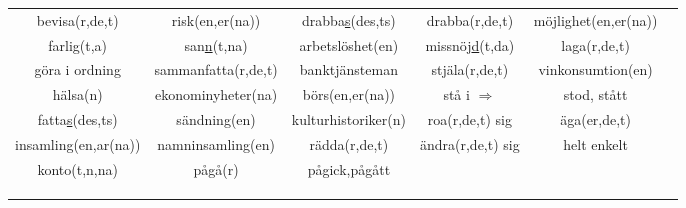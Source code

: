 \begin{center}
\begin{adjustwidth}{-2.6cm}{}
\begin{tabular}{|c c c c c c|}
            bevisa(r,de,t) & risk(en,er(na)) & drabba\underline{s}(des,ts) & drabba(r,de,t) & möjlighet(en,er(na)) &  \\
            farlig(t,a) & san\underline{n}(t,na) & arbetslöshet(en) & missnöj\underline{d}(t,da) & laga(r,de,t) &  \\
            göra i ordning & sammanfatta(r,de,t) & banktjänsteman & stjäla(r,de,t) & vinkonsumtion(en) &  \\
            hälsa(n) & ekonominyheter(na) & börs(en,er(na)) & stå i $\Rightarrow$ & stod, stått &  \\
            fatta\underline{s}(des,ts) & sändning(en) & kulturhistoriker(n) & roa(r,de,t) sig & äga(er,de,t) &  \\
            insamling(en,ar(na)) & namninsamling(en) & rädda(r,de,t) & ändra(r,de,t) sig & helt enkelt &  \\
            konto(t,n,na) & pågå(r) & pågick,pågått &  &  &  \\
             &  &  &  &  &  \\
             &  &  &  &  &  \\
             &  &  &  &  &  \\
            \hline
        \end{tabular}
    \end{adjustwidth}
\end{center}


